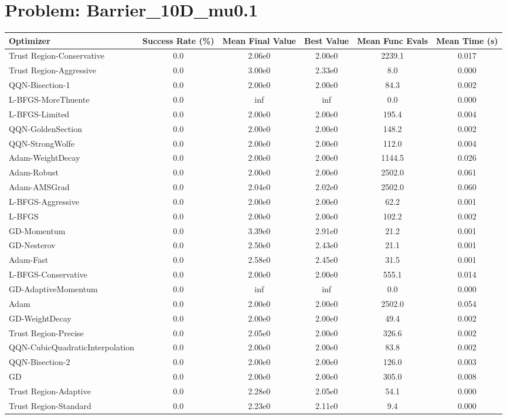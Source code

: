 \documentclass{article}
\begin{document}
\section{Problem: Barrier\_10D\_mu0.1}
\begin{longtable}{p{3cm}*{5}{c}}
\toprule
\textbf{Optimizer} & \textbf{Success Rate (\%)} & \textbf{Mean Final Value} & \textbf{Best Value} & \textbf{Mean Func Evals} & \textbf{Mean Time (s)} \\
\midrule
Trust Region-Conservative & 0.0 & 2.06e0 & 2.00e0 & 2239.1 & 0.017 \\
Trust Region-Aggressive & 0.0 & 3.00e0 & 2.33e0 & 8.0 & 0.000 \\
QQN-Bisection-1 & 0.0 & 2.00e0 & 2.00e0 & 84.3 & 0.002 \\
L-BFGS-MoreThuente & 0.0 & inf & inf & 0.0 & 0.000 \\
L-BFGS-Limited & 0.0 & 2.00e0 & 2.00e0 & 195.4 & 0.004 \\
QQN-GoldenSection & 0.0 & 2.00e0 & 2.00e0 & 148.2 & 0.002 \\
QQN-StrongWolfe & 0.0 & 2.00e0 & 2.00e0 & 112.0 & 0.004 \\
Adam-WeightDecay & 0.0 & 2.00e0 & 2.00e0 & 1144.5 & 0.026 \\
Adam-Robust & 0.0 & 2.00e0 & 2.00e0 & 2502.0 & 0.061 \\
Adam-AMSGrad & 0.0 & 2.04e0 & 2.02e0 & 2502.0 & 0.060 \\
L-BFGS-Aggressive & 0.0 & 2.00e0 & 2.00e0 & 62.2 & 0.001 \\
L-BFGS & 0.0 & 2.00e0 & 2.00e0 & 102.2 & 0.002 \\
GD-Momentum & 0.0 & 3.39e0 & 2.91e0 & 21.2 & 0.001 \\
GD-Nesterov & 0.0 & 2.50e0 & 2.43e0 & 21.1 & 0.001 \\
Adam-Fast & 0.0 & 2.58e0 & 2.45e0 & 31.5 & 0.001 \\
L-BFGS-Conservative & 0.0 & 2.00e0 & 2.00e0 & 555.1 & 0.014 \\
GD-AdaptiveMomentum & 0.0 & inf & inf & 0.0 & 0.000 \\
Adam & 0.0 & 2.00e0 & 2.00e0 & 2502.0 & 0.054 \\
GD-WeightDecay & 0.0 & 2.00e0 & 2.00e0 & 49.4 & 0.002 \\
Trust Region-Precise & 0.0 & 2.05e0 & 2.00e0 & 326.6 & 0.002 \\
QQN-CubicQuadraticInterpolation & 0.0 & 2.00e0 & 2.00e0 & 83.8 & 0.002 \\
QQN-Bisection-2 & 0.0 & 2.00e0 & 2.00e0 & 126.0 & 0.003 \\
GD & 0.0 & 2.00e0 & 2.00e0 & 305.0 & 0.008 \\
Trust Region-Adaptive & 0.0 & 2.28e0 & 2.05e0 & 54.1 & 0.000 \\
Trust Region-Standard & 0.0 & 2.23e0 & 2.11e0 & 9.4 & 0.000 \\
\bottomrule
\end{longtable}
\end{document}
